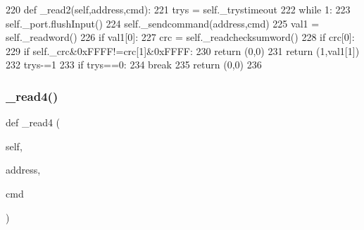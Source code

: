 \begin{DoxyCode}
220     \textcolor{keyword}{def }\_read2(self,address,cmd):
221         trys = self.\_trystimeout
222         \textcolor{keywordflow}{while} 1:
223             self.\_port.flushInput()
224             self.\_sendcommand(address,cmd)
225             val1 = self.\_readword()
226             \textcolor{keywordflow}{if} val1[0]:
227                 crc = self.\_readchecksumword()
228                 \textcolor{keywordflow}{if} crc[0]:
229                     \textcolor{keywordflow}{if} self.\_crc&0xFFFF!=crc[1]&0xFFFF:
230                         \textcolor{keywordflow}{return} (0,0)
231                     \textcolor{keywordflow}{return} (1,val1[1])
232             trys-=1
233             \textcolor{keywordflow}{if} trys==0:
234                 \textcolor{keywordflow}{break}
235         \textcolor{keywordflow}{return} (0,0)
236 
\end{DoxyCode}
\mbox{\label{classtoxic__hardware_1_1roboclaw__3_1_1Roboclaw_ab914d94db06afb55cd43bd797ee5938a}} 
\subsubsection{\texorpdfstring{\+\_\+read4()}{\_read4()}}
{\footnotesize\ttfamily def \+\_\+read4 (\begin{DoxyParamCaption}\item[{}]{self,  }\item[{}]{address,  }\item[{}]{cmd }\end{DoxyParamCaption})\hspace{0.3cm}{\ttfamily [private]}}



